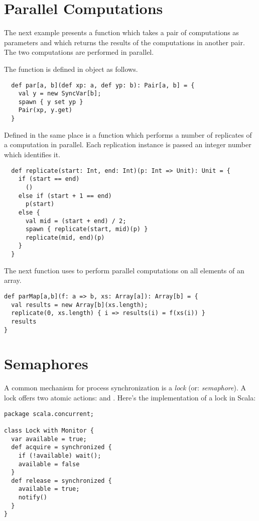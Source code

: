 \documentclass[a4paper,12pt,twoside,titlepage]{book}
\begin{document}
{\section{Parallel Computations}

The next example presents a function  which takes a pair of
computations as parameters and which returns the results of the computations
in another pair. The two computations are performed in parallel.

The function is defined in object
 as follows.
\begin{lstlisting}
  def par[a, b](def xp: a, def yp: b): Pair[a, b] = {
    val y = new SyncVar[b];
    spawn { y set yp }
    Pair(xp, y.get)
  }
\end{lstlisting}
Defined in the same place is a function  which performs a
number of replicates of a computation in parallel. Each
replication instance is passed an integer number which identifies it.
\begin{lstlisting}
  def replicate(start: Int, end: Int)(p: Int => Unit): Unit = {
    if (start == end) 
      ()
    else if (start + 1 == end)
      p(start)
    else {
      val mid = (start + end) / 2;
      spawn { replicate(start, mid)(p) }
      replicate(mid, end)(p)
    }
  }
\end{lstlisting}

The next function uses  to perform parallel
computations on all elements of an array.

\begin{lstlisting}
def parMap[a,b](f: a => b, xs: Array[a]): Array[b] = {
  val results = new Array[b](xs.length);
  replicate(0, xs.length) { i => results(i) = f(xs(i)) }
  results
}
\end{lstlisting}

\section{Semaphores}

A common mechanism for process synchronization is a {\em lock} (or:
{\em semaphore}). A lock offers two atomic actions:  and
. Here's the implementation of a lock in Scala:

\begin{lstlisting}
package scala.concurrent;

class Lock with Monitor {
  var available = true;
  def acquire = synchronized {
    if (!available) wait();
    available = false
  }
  def release = synchronized {
    available = true;
    notify()
  }
}
\end{lstlisting}

}
\end{document}
